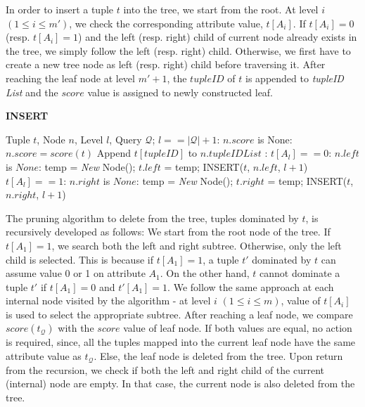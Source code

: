 \vspace{1mm}
 In order to insert a tuple $t$ into the tree, we start from the root. At level $i$ $(1 \leq i \leq m')$, we check the corresponding attribute value, $t[A_i]$. If $t[A_i] = 0$ (resp. $t[A_i] = 1$) and the left (resp. right) child of current node already exists in the tree, we simply follow the left (resp. right) child. Otherwise, we first have to create a new tree node as left (resp. right) child before traversing it. After reaching the leaf node at level $m'+1$, the $tupleID$ of $t$ is appended to \textit{tupleID List} and the $score$ value is assigned to newly constructed leaf.

\begin{algorithm}[!htb]
\caption{{\bf INSERT}}
\begin{algorithmic}[1]
\label{alg:insertTuple}
 Tuple $t$, Node $n$, Level $l$, Query $\mathcal{Q}$;
 $l == |\mathcal{Q}| + 1$:
    \STATE {} $n.score$ is None: $n.score = score(t)$
    \STATE \hindent Append $t[tupleID]$ to $n.tupleIDList$
:
    \STATE {} $t[A_l]==0$:
        \STATE {} $n.left$ is $None$:
           \STATE \hindent[3] temp = {\it New} Node();
           \STATE \hindent[3] $t.left$ = temp;
        \STATE \hindent[2] INSERT($t$, $n.left$, $l+1$)
    \STATE {} $t[A_l]==1$:
        \STATE {} $n.right$ is $None$:
           \STATE \hindent[3] temp = {\it New} Node();
           \STATE \hindent[3] $t.right$ = temp;
        \STATE \hindent[2] INSERT($t$, $n.right$, $l+1$)
\end{algorithmic}
\end{algorithm}

\vspace{1mm}
 The pruning algorithm to delete from the tree, tuples dominated by $t$, is recursively developed as follows: We start from the root node of the tree. If $t[A_1] = 1$, we search both the left and right subtree. Otherwise, only the left child is selected. This is because if $t[A_1] = 1$, a tuple $t'$ dominated by $t$ can assume value  0 or 1 on attribute $A_1$. On the other hand, $t$ cannot dominate a tuple $t'$ if $t[A_1] = 0$ and $t'[A_1] = 1$. We follow the same approach at each internal node visited by the algorithm - at level $i$ $(1 \leq i \leq m)$, value of $t[A_i]$ is used to select the appropriate subtree. After reaching a leaf node, we compare $score(t_{\mathcal{Q}})$ with the $score$ value of leaf node. If both values are equal, no action is required, since, all the tuples mapped into the current leaf node have the same attribute value as $t_{\mathcal{Q}}$. Else, the leaf node is deleted from the tree. Upon return from the recursion, we check if both the left and right child of the current (internal) node are empty. In that case, the current node is also deleted from the tree.


